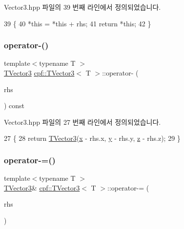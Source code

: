 Vector3.\+hpp 파일의 39 번째 라인에서 정의되었습니다.


\begin{DoxyCode}
39                                                   \{
40             *\textcolor{keyword}{this} = *\textcolor{keyword}{this} + rhs;
41             \textcolor{keywordflow}{return} *\textcolor{keyword}{this};
42         \}
\end{DoxyCode}
\mbox{\label{classcpf_1_1_t_vector3_ace31dd2825b1b64c3840e13d9101252d}} 
\subsubsection{\texorpdfstring{operator-\/()}{operator-()}}
{\footnotesize\ttfamily template$<$typename T $>$ \\
\hyperlink{classcpf_1_1_t_vector3}{T\+Vector3} \hyperlink{classcpf_1_1_t_vector3}{cpf\+::\+T\+Vector3}$<$ T $>$\+::operator-\/ (\begin{DoxyParamCaption}\item[{const \hyperlink{classcpf_1_1_t_vector3}{T\+Vector3}$<$ T $>$ \&}]{rhs }\end{DoxyParamCaption}) const\hspace{0.3cm}{\ttfamily [inline]}}



Vector3.\+hpp 파일의 27 번째 라인에서 정의되었습니다.


\begin{DoxyCode}
27                                                       \{
28             \textcolor{keywordflow}{return} \hyperlink{classcpf_1_1_t_vector3_a31544bebbd3d8737adf44460256b57fd}{TVector3}(\hyperlink{classcpf_1_1_t_vector3_ad3df42808358a64c518d6349ede446d8}{x} - rhs.x, \hyperlink{classcpf_1_1_t_vector3_a2371a0583e76dcc80c6f10dd168cde1b}{y} - rhs.y, \hyperlink{classcpf_1_1_t_vector3_ae7ea5f4b24c3438a44eb6b0fdfe02823}{z} - rhs.z);
29         \}
\end{DoxyCode}
\mbox{\label{classcpf_1_1_t_vector3_a8ce621a24abceaeeb02de90e99b2716e}} 
\subsubsection{\texorpdfstring{operator-\/=()}{operator-=()}}
{\footnotesize\ttfamily template$<$typename T $>$ \\
\hyperlink{classcpf_1_1_t_vector3}{T\+Vector3}\& \hyperlink{classcpf_1_1_t_vector3}{cpf\+::\+T\+Vector3}$<$ T $>$\+::operator-\/= (\begin{DoxyParamCaption}\item[{const \hyperlink{classcpf_1_1_t_vector3}{T\+Vector3}$<$ T $>$ \&}]{rhs }\end{DoxyParamCaption})\hspace{0.3cm}{\ttfamily [inline]}}



